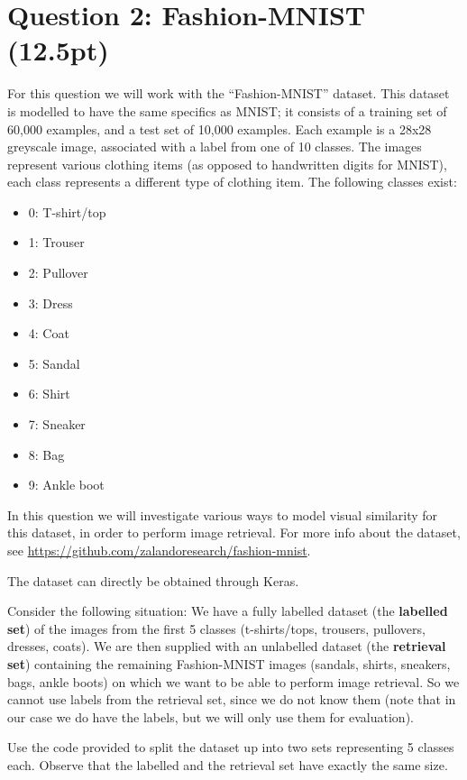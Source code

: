 \documentclass[a4paper,twoside,10pt]{article}
\begin{document}
\section*{Question 2: Fashion-MNIST (12.5pt)}
For this question we will work with the ``Fashion-MNIST'' dataset. This dataset is modelled to have the same specifics as MNIST; it consists of a training set of 60,000 examples, and a test set of 10,000 examples. Each example is a 28x28 greyscale image, associated with a label from one of 10 classes. The images represent various clothing items (as opposed to handwritten digits for MNIST), each class represents a different type of clothing item. The following classes exist:

\begin{itemize}
\item 0: T-shirt/top
\item 1: Trouser
\item 2: Pullover
\item 3: Dress
\item 4: Coat
\item 5: Sandal
\item 6: Shirt
\item 7: Sneaker
\item 8: Bag
\item 9: Ankle boot
\end{itemize}

In this question we will investigate various ways to model visual similarity for this dataset, in order to perform image retrieval. For more info about the dataset, see \url{https://github.com/zalandoresearch/fashion-mnist}.

The dataset can directly be obtained through Keras.

\medskip

Consider the following situation: We have a fully labelled dataset (the \textbf{labelled set}) of the images from the first 5 classes (t-shirts/tops, trousers, pullovers, dresses, coats). We are then supplied with an unlabelled dataset (the \textbf{retrieval set}) containing the remaining Fashion-MNIST images (sandals, shirts, sneakers, bags, ankle boots) on which we want to be able to perform image retrieval. So we cannot use labels from the retrieval set, since we do not know them (note that in our case we do have the labels, but we will only use them for evaluation).

Use the code provided to split the dataset up into two sets representing 5 classes each. Observe that the labelled and the retrieval set have exactly the same size.
\end{document}

